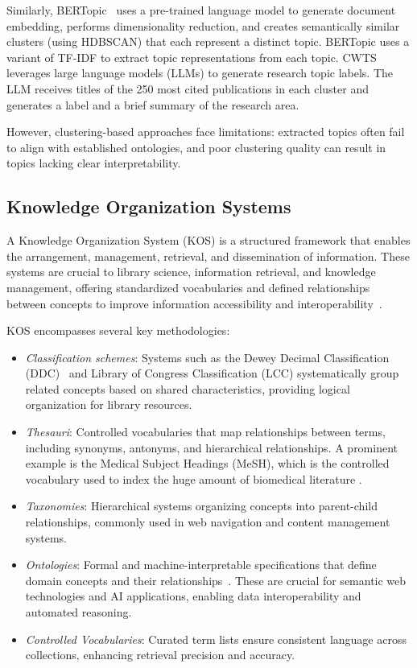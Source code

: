 Similarly, BERTopic~\cite{grootendorst2022bertopic} uses a pre-trained language model to generate document embedding, performs dimensionality reduction, and creates semantically similar clusters (using HDBSCAN) that each represent a distinct topic. BERTopic uses a variant of TF-IDF to extract topic representations from each topic. 
CWTS~\cite{van2024open} leverages large language models (LLMs) to generate research topic labels. The LLM receives titles of the 250 most cited publications in each cluster and generates a label and a brief summary of the research area. 

However, clustering-based approaches face limitations: extracted topics often fail to align with established ontologies, and poor clustering quality can result in topics lacking clear interpretability.

\subsection{Knowledge Organization Systems} 

A Knowledge Organization System (KOS) \cite{salatino:2024} is a structured framework that enables the arrangement, management, retrieval, and dissemination of information. 
These systems are crucial to library science, information retrieval, and knowledge management, offering standardized vocabularies and defined relationships between concepts to improve information accessibility and interoperability~\cite{Hodge:2000}. 

KOS encompasses several key methodologies:
\begin{itemize}[leftmargin=*]
    \item \emph{Classification schemes}: Systems such as the Dewey Decimal Classification (DDC)~\cite{Dewey:2011} and Library of Congress Classification (LCC) systematically group related concepts based on shared characteristics, providing logical organization for library resources.
    \item \emph{Thesauri}: Controlled vocabularies that map relationships between terms, including synonyms, antonyms, and hierarchical relationships. A prominent example is the Medical Subject Headings (MeSH), which is the controlled vocabulary used to index the huge amount of biomedical literature \cite{NLM:2022}.
    \item \emph{Taxonomies}: Hierarchical systems organizing concepts into parent-child relationships, commonly used in web navigation and content management systems.
    \item \emph{Ontologies}: Formal and machine-interpretable specifications that define domain concepts and their relationships~\cite{Guarino:2009}. These are crucial for semantic web technologies and AI applications, enabling data interoperability and automated reasoning.
    \item \emph{Controlled Vocabularies}: Curated term lists ensure consistent language across collections, enhancing retrieval precision and accuracy.
\end{itemize}

